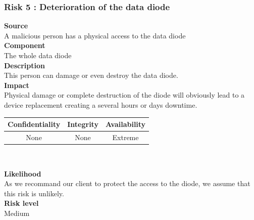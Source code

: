 \documentclass[a4paper,11pt]{article}
\begin{document}
\subsubsection{Risk 5 : Deterioration of the data diode }
\textbf{Source} \\A malicious person has a physical access to the data diode\\
\textbf{Component} \\The whole data diode\\
\textbf{Description}\\ This person can damage or even destroy the data diode.  \\
\textbf{Impact}\\
Physical damage or complete destruction of the diode will obviously lead to a device replacement creating a several hours or days downtime.\\
\begin{center}
\begin{tabular}{|c|c|c|}
\hline
\textbf{Confidentiality} & \textbf{Integrity} & \textbf{Availability} \\
\hline
None & None & Extreme \\
\hline
\end{tabular}\\
\end{center}
\textbf{Likelihood}\\ As we recommand our client to protect the access to the diode, we assume that this risk is unlikely.\\
\textbf{Risk level}\\Medium\\
\end{document}

